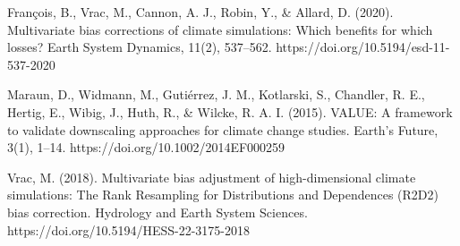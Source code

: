 \documentclass[letterpaper,10pt]{article}
\begin{document}
\begin{thebibliography}{6}
 François, B., Vrac, M., Cannon, A. J., Robin, Y., \& Allard, D. (2020). Multivariate bias corrections of climate simulations: Which benefits for which losses? Earth System Dynamics, 11(2), 537–562. https://doi.org/10.5194/esd-11-537-2020

 Maraun, D., Widmann, M., Gutiérrez, J. M., Kotlarski, S., Chandler, R. E., Hertig, E., Wibig, J., Huth, R., \& Wilcke, R. A. I. (2015). VALUE: A framework to validate downscaling approaches for climate change studies. Earth’s Future, 3(1), 1–14. https://doi.org/10.1002/2014EF000259

 Vrac, M. (2018). Multivariate bias adjustment of high-dimensional climate simulations: The Rank Resampling for Distributions and Dependences (R2D2) bias correction. Hydrology and Earth System Sciences. https://doi.org/10.5194/HESS-22-3175-2018
\end{thebibliography}
\end{document}
